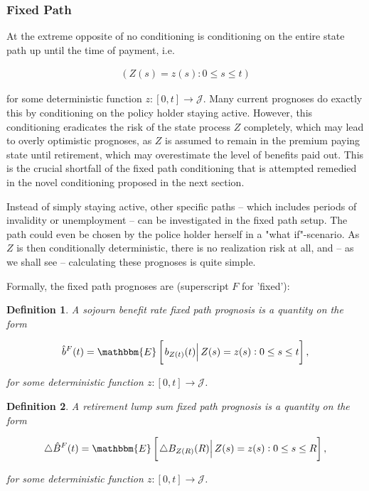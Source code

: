 \documentclass{article}
\newcommand{\1}[1]{\mathbbm{1}_{\left\lbrace #1 \right\rbrace}}
\newcommand{\econd}[2][def]{\mathbbm{E} \left[ \left. #1 \right| #2 \right]}
\theoremstyle{break}
\newtheorem{definition}{Definition}[section]
\theoremstyle{remark}
\numberwithin{equation}{section}
\begin{document}
\subsubsection{Fixed Path}

At the extreme opposite of no conditioning is conditioning on the entire state path up until the time of payment, i.e.

\begin{align*}
\left( Z(s) = z(s) : 0 \leq s \leq t \right)
\end{align*}

for some deterministic function $z: [0,t] \to \mathcal{J}$. Many current prognoses do exactly this by conditioning on the policy holder staying active. However, this conditioning eradicates the risk of the state process $Z$ completely, which may lead to overly optimistic prognoses, as $Z$ is assumed to remain in the premium paying state until retirement, which may overestimate the level of benefits paid out. This is the crucial shortfall of the fixed path conditioning that is attempted remedied in the novel conditioning proposed in the next section.

Instead of simply staying active, other specific paths -- which includes periods of invalidity or unemployment -- can be investigated in the fixed path setup. The path could even be chosen by the police holder herself in a "what if"-scenario. As $Z$ is then conditionally deterministic, there is no realization risk at all, and -- as we shall see -- calculating these prognoses is quite simple.

Formally, the fixed path prognoses are (superscript $F$ for 'fixed'):

\begin{definition}
	A sojourn benefit rate fixed path prognosis is a quantity on the form
	
	\begin{gather*}
		\hat{b}^F(t) = \econd[b_{Z(t)}(t)]{Z(s) = z(s) : 0 \leq s \leq t},
	\end{gather*}
	
	for some deterministic function $z: [0,t] \to \mathcal{J}$.
\end{definition}

\begin{definition}
	A retirement lump sum fixed path prognosis is a quantity on the form
	
	\begin{gather*}
		\triangle \hat{B}^F(t) = \econd[\triangle B_{Z(R)}(R)]{Z(s) = z(s) : 0 \leq s \leq R},
	\end{gather*}
	
	for some deterministic function $z: [0,t] \to \mathcal{J}$.
\end{definition}
\end{document}
